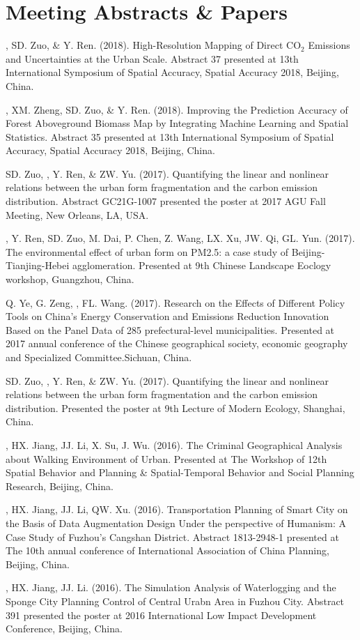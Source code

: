 \section*{Meeting Abstracts \& Papers}
\begin{etaremune}
\item
    \Shaoqing, SD. Zuo, \& Y. Ren. (2018).
    High-Resolution Mapping of Direct CO$_2$ Emissions and Uncertainties at the Urban Scale.
    Abstract 37 presented at 13th International Symposium of Spatial Accuracy, Spatial Accuracy 2018, Beijing, China.
\item
    \Shaoqing\CF, XM. Zheng, SD. Zuo, \& Y. Ren. (2018).
    Improving the Prediction Accuracy of Forest Aboveground Biomass Map by Integrating Machine Learning and Spatial Statistics.
    Abstract 35 presented at 13th International Symposium of Spatial Accuracy, Spatial Accuracy 2018, Beijing, China.
\item
    SD. Zuo, \Shaoqing, Y. Ren, \&  ZW. Yu. (2017).
    Quantifying the linear and nonlinear relations between the urban form fragmentation and the carbon emission distribution.
    Abstract GC21G-1007 presented the poster at 2017 AGU Fall Meeting, New Orleans, LA, USA.
\item
    \Shaoqing, Y. Ren, SD. Zuo, M. Dai, P. Chen, Z. Wang, LX. Xu, JW. Qi, GL. Yun. (2017).
    The environmental effect of urban form on PM2.5: a case study of Beijing-Tianjing-Hebei agglomeration.
    Presented at 9th Chinese Landscape Eoclogy workshop, Guangzhou, China.
\item
    Q. Ye, G. Zeng, \Shaoqing, FL. Wang. (2017).
     Research on the Effects of Different Policy Tools on China’s Energy Conservation and Emissions Reduction Innovation Based on the Panel Data of 285 prefectural-level municipalities.
     Presented at 2017 annual conference of the Chinese geographical society, economic geography and Specialized Committee.Sichuan, China.
\item
    SD. Zuo, \Shaoqing, Y. Ren, \&  ZW. Yu. (2017).
    Quantifying the linear and nonlinear relations between the urban form fragmentation and the carbon emission distribution.
    Presented the poster at 9th Lecture of Modern Ecology, Shanghai, China.
\item
    \Shaoqing, HX. Jiang, JJ. Li, X. Su, J. Wu. (2016).
    The Criminal Geographical Analysis about Walking Environment of Urban.
    Presented at The Workshop of 12th Spatial Behavior and Planning \& Spatial-Temporal Behavior and Social Planning Research, Beijing, China.
\item
    \Shaoqing, HX. Jiang, JJ. Li, QW. Xu. (2016).
    Transportation Planning of Smart City on the Basis of Data Augmentation Design Under the perspective of Humanism: A Case Study of Fuzhou’s Cangshan District.
    Abstract 1813-2948-1 presented at The 10th annual conference of International Association of China Planning, Beijing, China.
\item
    \Shaoqing, HX. Jiang, JJ. Li. (2016).
    The Simulation Analysis of Waterlogging and the Sponge City Planning Control of Central Urabn Area in Fuzhou City.
    Abstract 391 presented the poster at 2016 International Low Impact Development Conference, Beijing, China.
\end{etaremune}
